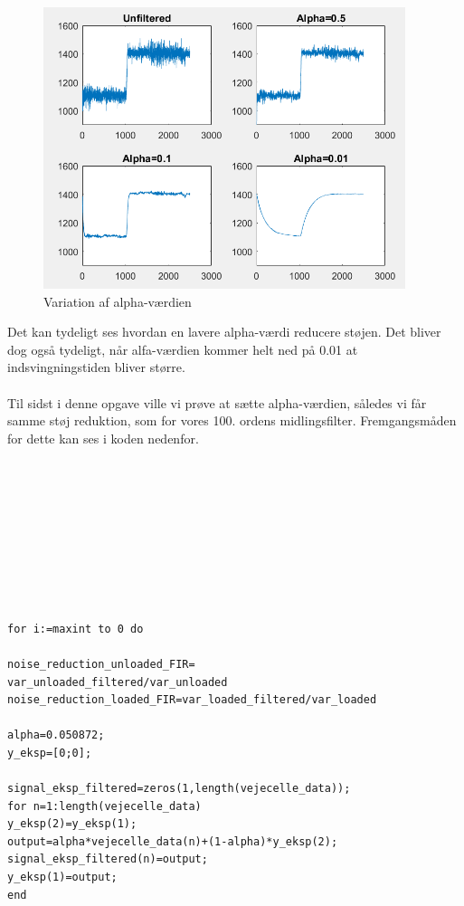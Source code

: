 \begin{figure}[H]
	\centering
	\includegraphics[width = 300pt]{Img/Alpha_variation.PNG}
	\caption{Variation af alpha-værdien}
	\label{fig:Alpha_variation}
\end{figure}

Det kan tydeligt ses hvordan en lavere alpha-værdi reducere støjen. Det bliver dog også tydeligt, når alfa-værdien kommer helt ned på 0.01 at indsvingningstiden bliver større. \\
\\
Til sidst i denne opgave ville vi prøve at sætte alpha-værdien, således vi får samme støj reduktion, som for vores 100. ordens midlingsfilter. 
Fremgangsmåden for dette kan ses i koden nedenfor. \\\\
\\
\\
\\
\\
\\
\\
\\
\\




\begin{lstlisting}[frame=single]  % Start your code-block
for i:=maxint to 0 do

noise_reduction_unloaded_FIR=
var_unloaded_filtered/var_unloaded
noise_reduction_loaded_FIR=var_loaded_filtered/var_loaded

alpha=0.050872;
y_eksp=[0;0];

signal_eksp_filtered=zeros(1,length(vejecelle_data));
for n=1:length(vejecelle_data)
y_eksp(2)=y_eksp(1);
output=alpha*vejecelle_data(n)+(1-alpha)*y_eksp(2);
signal_eksp_filtered(n)=output;
y_eksp(1)=output;
end


\end{lstlisting}

